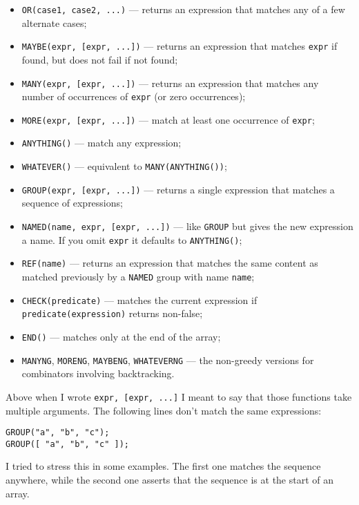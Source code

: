 \documentclass[a4paper,10pt]{article}
\begin{document}
\begin{itemize}
\item \texttt{OR(case1, case2, ...)} — returns an expression that matches any of a few
  alternate cases;
\item \texttt{MAYBE(expr, [expr, ...])} — returns an expression that matches \texttt{expr} if
  found, but does not fail if not found;
\item \texttt{MANY(expr, [expr, ...])} — returns an expression that matches any number of
  occurrences of \texttt{expr} (or zero occurrences);
\item \texttt{MORE(expr, [expr, ...])} — match at least one occurrence of \texttt{expr};
\item \texttt{ANYTHING()} — match any expression;
\item \texttt{WHATEVER()} — equivalent to \texttt{MANY(ANYTHING())};
\item \texttt{GROUP(expr, [expr, ...])} — returns a single expression that matches a
  sequence of expressions;
\item \texttt{NAMED(name, expr, [expr, ...])} — like \texttt{GROUP} but gives the new
  expression a name.  If you omit \texttt{expr} it defaults to \texttt{ANYTHING()};
\item \texttt{REF(name)} — returns an expression that matches the same content as
  matched previously by a \texttt{NAMED} group with name \texttt{name};
\item \texttt{CHECK(predicate)} — matches the current expression if
  \texttt{predicate(expression)} returns non-false;
\item \texttt{END()} — matches only at the end of the array;
\item \texttt{MANYNG}, \texttt{MORENG}, \texttt{MAYBENG}, \texttt{WHATEVERNG} — the non-greedy versions for
  combinators involving backtracking.
\end{itemize}

Above when I wrote \texttt{expr, [expr, ...]} I meant to say that those functions
take multiple arguments.  The following lines don't match the same
expressions:


\begin{verbatim}
GROUP("a", "b", "c");
GROUP([ "a", "b", "c" ]);
\end{verbatim}

I tried to stress this in some examples.  The first one matches the sequence
anywhere, while the second one asserts that the sequence is at the start of
an array.
\end{document}
